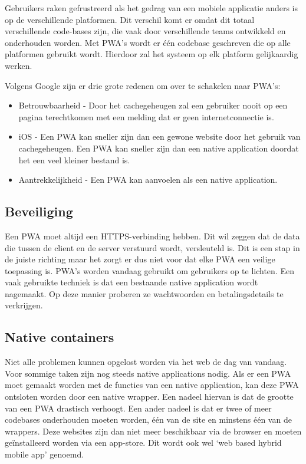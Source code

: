 Gebruikers raken gefrustreerd als het gedrag van een mobiele applicatie anders is op de verschillende platformen. Dit verschil komt er omdat dit totaal verschillende code-bases zijn, die vaak door verschillende teams ontwikkeld en onderhouden worden. Met PWA's wordt er één codebase geschreven die op alle platformen gebruikt wordt. Hierdoor zal het systeem op elk platform gelijkaardig werken.
\autocite{Google2019}

Volgens Google zijn er drie grote redenen om over te schakelen naar PWA's:
\begin{itemize}
    \item Betrouwbaarheid - Door het cachegeheugen zal een gebruiker nooit op een pagina terechtkomen met een melding dat er geen internetconnectie is.
    \item iOS - Een PWA kan sneller zijn dan een gewone website door het gebruik van cachegeheugen. Een PWA kan sneller zijn dan een native application doordat het een veel kleiner bestand is.
    \item Aantrekkelijkheid - Een PWA kan aanvoelen als een native application.
\end{itemize}
\autocite{GooglePwa2019}

\subsection{Beveiliging}
Een PWA moet altijd een HTTPS-verbinding hebben. Dit wil zeggen dat de data die tussen de client en de server verstuurd wordt, versleuteld is.
\autocite{Durumeric2013}
Dit is een stap in de juiste richting maar het zorgt er dus niet voor dat elke PWA een veilige toepassing is. PWA's worden vandaag gebruikt om gebruikers op te lichten. Een vaak gebruikte techniek is dat een bestaande native application wordt nagemaakt. Op deze manier proberen ze wachtwoorden en betalingsdetails te verkrijgen.
\autocite{Lee2018}

\subsection{Native containers}
Niet alle problemen kunnen opgelost worden via het web de dag van vandaag. Voor sommige taken zijn nog steeds native applications nodig. Als er een PWA moet gemaakt worden met de functies van een native application, kan deze PWA ontsloten worden door een native wrapper.
Een nadeel hiervan is dat de grootte van een PWA drastisch verhoogt.
Een ander nadeel is dat er twee of meer codebases onderhouden moeten worden, één van de site en minstens één van de wrappers.
Deze websites zijn dan niet meer beschikbaar via de browser en moeten geïnstalleerd worden via een app-store.
Dit wordt ook wel ‘web based hybrid mobile app’ genoemd.
\autocite{Richard2019} \autocite{Malavolta2016}

